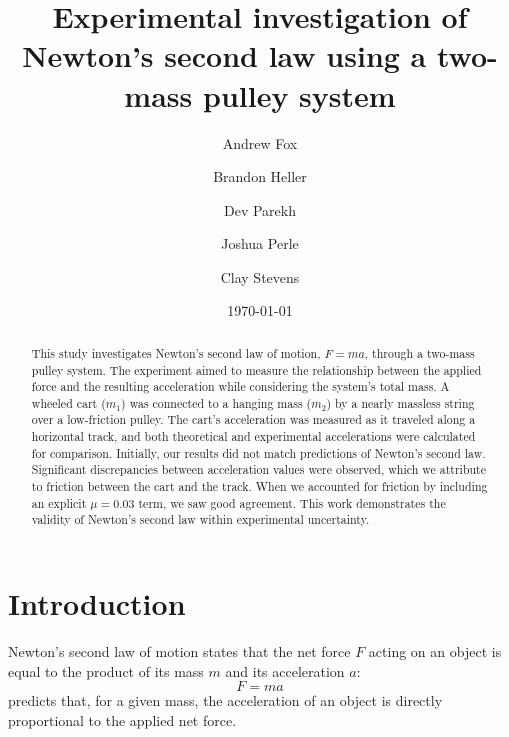 \documentclass[reprint,amsmath,amssymb,aps]{revtex4-2}
\begin{document}
\title{Experimental investigation of Newton's second law using a two-mass pulley system}
\author{Andrew Fox}
\author{Brandon Heller}
\author{Dev Parekh}
\author{Joshua Perle}
\author{Clay Stevens}
\date{\today}

\begin{abstract}
This study investigates Newton’s second law of motion, $F = ma$, through a two-mass pulley system. The experiment aimed to measure the relationship between the applied force and the resulting acceleration while considering the system's total mass. A wheeled cart ($m_1$) was connected to a hanging mass ($m_2$) by a nearly massless string over a low-friction pulley. The cart’s acceleration was measured as it traveled along a horizontal track, and both theoretical and experimental accelerations were calculated for comparison. Initially, our results did not match predictions of Newton's second law. Significant discrepancies between acceleration values were observed, which we attribute to friction between the cart and the track. When we accounted for friction by including an explicit $\mu=0.03$ term, we saw good agreement. This work demonstrates the validity of Newton’s second law within experimental uncertainty.
\end{abstract}


\maketitle






\section{Introduction}
Newton’s second law of motion states that the net force $F$ acting on an object is equal to the product of its mass $m$ and its acceleration $a$:
\begin{equation}
F = ma
\label{eq:1}
\end{equation}
 predicts that, for a given mass, the acceleration of an object is directly proportional to the applied net force. 
\end{document}
